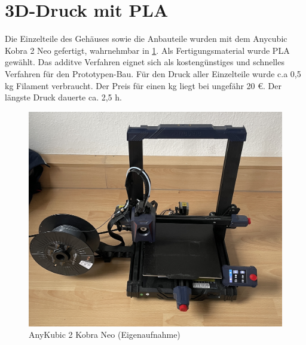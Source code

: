 \section{3D-Druck mit PLA}
Die Einzelteile des Gehäuses sowie die Anbauteile wurden mit dem Anycubic Kobra 2 Neo gefertigt, wahrnehmbar in \ref{AKK2N}. Als Fertigungsmaterial wurde PLA gewählt. Das additve Verfahren eignet sich als kostengünstiges und schnelles Verfahren für den Prototypen-Bau. Für den Druck aller Einzelteile wurde c.a 0,5 kg Filament verbraucht. Der Preis für einen kg liegt bei ungefähr 20 €. Der längste Druck dauerte ca. 2,5 h. 

	 \begin{figure}[H]
	 	\begin{center}
	 		\includegraphics[width=\textwidth]{Images/Konstruktion/AKK2N.jpg}
	 		\caption{AnyKubic 2 Kobra Neo (Eigenaufnahme)} \label{AKK2N}
	 	\end{center}
	 \end{figure}  
